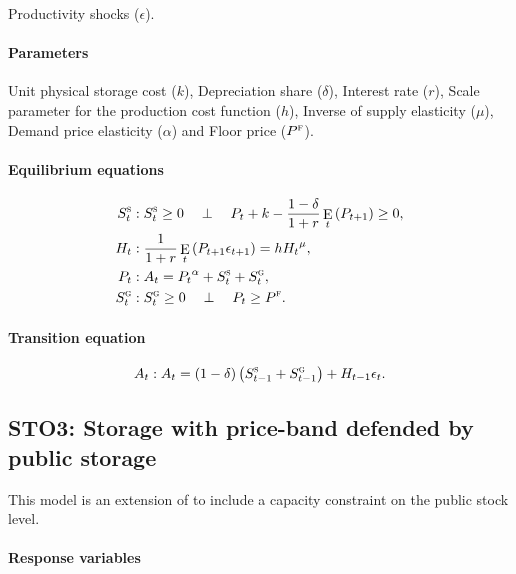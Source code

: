 \documentclass[11pt,fleqn]{article}
\DeclareMathOperator{\E}{E}
\newcommand{\Ss}{S^{\textsc{s}}}
\newcommand{\Sg}{S^{\textsc{g}}}
\newcommand{\PF}{P^{\textsc{f}}}
\newcommand{\CP}{\quad \perp \quad}
\begin{document}
Productivity shocks ($\epsilon$).

\paragraph{Parameters}
\label{sec:parameters}

Unit physical storage cost ($k$), Depreciation share ($\delta$), Interest rate
($r$), Scale parameter for the production cost function ($h$), Inverse of supply
elasticity ($\mu$), Demand price elasticity ($\alpha$) and Floor price ($\PF$).

\paragraph{Equilibrium equations}
\label{sec:equil-equat}

\begin{align}
  \Ss_{t}&: \Ss_{t}\ge 0 \CP P_{t}+k-\frac{1-\delta}{1+r}\E_{t}\left(P_{t+1}\right)\ge 0,\\
  H_{t}&: \frac{1}{1+r}\E_{t}\left(P_{t+1}\epsilon_{t+1}\right)=h {H_{t}}^{\mu},\\
  P_{t}&: A_{t}={P_{t}}^{\alpha}+\Ss_{t}+\Sg_{t},\\
  \Sg_{t}&: \Sg_{t}\ge 0 \CP P_{t}\ge\PF.
\end{align}

\paragraph{Transition equation}
\label{sec:transition-equation}

\begin{equation}
  A_{t}: A_{t}=\left(1-\delta\right)\left(\Ss_{t-1}+\Sg_{t-1}\right)+H_{t-1}\epsilon_{t}.
\end{equation}

\subsection{STO3: Storage with price-band defended by public storage}
\label{sec:storage-with-price}

This model is an extension of \citet{Mira88} to include a capacity constraint on
the public stock level.

\paragraph{Response variables}
\label{sec:response-variables}
\end{document}
